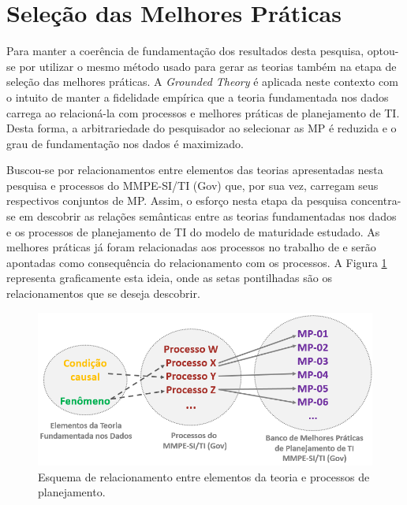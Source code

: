 \section{Seleção das Melhores Práticas}

Para manter a coerência de fundamentação dos resultados desta pesquisa, optou-se por utilizar o mesmo método usado para gerar as teorias também na etapa de seleção das melhores práticas. A \textit{Grounded Theory} é aplicada neste contexto com o intuito de manter a fidelidade empírica que a teoria fundamentada nos dados carrega ao relacioná-la com processos e melhores práticas de planejamento de TI. Desta forma, a arbitrariedade do pesquisador ao selecionar as MP é reduzida e o grau de fundamentação nos dados é maximizado.

Buscou-se por relacionamentos entre elementos das teorias apresentadas nesta pesquisa e processos do MMPE-SI/TI (Gov) que, por sua vez, carregam seus respectivos conjuntos de MP. Assim, o esforço nesta etapa da pesquisa concentra-se em descobrir as relações semânticas entre as teorias fundamentadas nos dados e os processos de planejamento de TI do modelo de maturidade estudado. As melhores práticas já foram relacionadas aos processos no trabalho de  e serão apontadas como consequência do relacionamento com os processos. A Figura \ref{figura:esquemaconjuntos} representa graficamente esta ideia, onde as setas pontilhadas são os relacionamentos que se deseja descobrir.

\begin{figure}[h!]
\centering %
\includegraphics[width=13cm]{figuras/conjuntos_relacionamentos.PNG}
\caption{Esquema de relacionamento entre elementos da teoria e processos de planejamento.}
\label{figura:esquemaconjuntos}
\end{figure}

